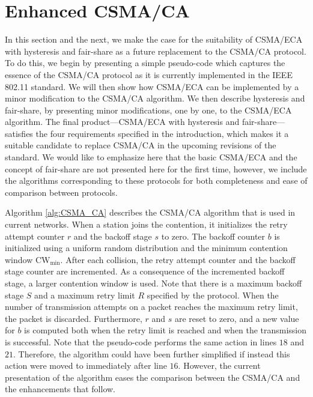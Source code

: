 \documentclass[conference]{IEEEtran}
\begin{document}
\section{Enhanced CSMA/CA}

In this section and the next, we make the case for the suitability of CSMA/ECA with hysteresis and fair-share as a future replacement to the CSMA/CA protocol. To do this, we begin by presenting a simple pseudo-code which captures the essence of the CSMA/CA protocol as it is currently implemented in the IEEE 802.11 standard. We will then show how CSMA/ECA can be implemented by a minor modification to the CSMA/CA algorithm. We then describe hysteresis and fair-share, by presenting minor modifications, one by one, to the CSMA/ECA algorithm. The final product---CSMA/ECA with hysteresis and fair-share---satisfies the four requirements specified in the introduction, which makes it a suitable candidate to replace CSMA/CA in the upcoming revisions of the standard. We would like to emphasize here that the basic CSMA/ECA and the concept of fair-share are not presented here for the first time, however, we include the algorithms corresponding to these protocols for both completeness and ease of comparison between protocols.

Algorithm \ref{alg:CSMA_CA} describes the CSMA/CA algorithm that is used in current networks.
When a station joins the contention, it initializes the retry attempt counter $r$ and the backoff stage $s$ to zero. The backoff counter $b$ is initialized using a uniform random distribution and the minimum contention window $\text{CW}_{\min}$. After each collision, the retry attempt counter and the backoff stage counter are incremented. As a consequence of the incremented backoff stage, a larger contention window is used. Note that there is a maximum backoff stage $S$ and a maximum retry limit $R$ specified by the protocol. When the number of transmission attempts on a packet reaches the maximum retry limit, the packet is discarded. Furthermore, $r$ and $s$ are reset to zero, and a new value for $b$ is computed both when the retry limit is reached and when the transmission is successful. Note that the pseudo-code performs the same action in lines $18$ and $21$. Therefore, the algorithm could have been further simplified if instead this action were moved to immediately after line $16$. However, the current presentation of the algorithm eases the comparison between the CSMA/CA and the enhancements that follow.

% 
% 
\end{document}
